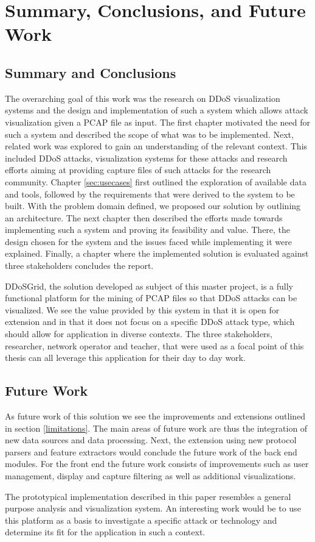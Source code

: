 \chapter{Summary, Conclusions, and Future Work} %
\section{Summary and Conclusions}
The overarching goal of this work was the research on DDoS visualization systems and the design and implementation of such a system which allows attack visualization given a PCAP file as input. The first chapter motivated the need for such a system and described the scope of what was to be implemented. Next, related work was explored to gain an understanding of the relevant context. This included DDoS attacks, visualization systems for these attacks and research efforts aiming at providing capture files of such attacks for the research community.
Chapter \ref{sec:usecases} first outlined the exploration of available data and tools, followed by the requirements that were derived to the system to be built. With the problem domain defined, we proposed our solution by outlining an architecture.
The next chapter then described the efforts made towards implementing such a system and proving its feasibility and value. There, the design chosen for the system and the issues faced while implementing it were explained.
Finally, a chapter where the implemented solution is evaluated against three stakeholders concludes the report.

DDoSGrid, the solution developed as subject of this master project, is a fully functional platform for the mining of PCAP files so that DDoS attacks can be visualized. We see the value provided by this system in that it is open for extension and in that it does not focus on a specific DDoS attack type, which should allow for application in diverse contexts. The three stakeholders, researcher, network operator and teacher, that were used as a focal point of this thesis can all leverage this application for their day to day work.

\section{Future Work}
As future work of this solution we see the improvements and extensions outlined in section \ref{limitations}. The main areas of future work are thus the integration of new data sources and data processing. Next, the extension using new protocol parsers and feature extractors would conclude the future work of the back end modules. For the front end the future work consists of improvements such as user management, display and capture filtering as well as additional visualizations.

The prototypical implementation described in this paper resembles a general purpose analysis and visualization system. An interesting work would be to use this platform as a basis to investigate a specific attack or technology and determine its fit for the application in such a context.